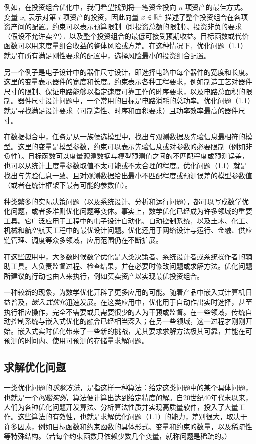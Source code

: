 例如，在投资组合优化中，我们希望找到将一笔资金投向 $n$ 项资产的最佳方式。变量 $x_i$ 表示对第 $i$ 项资产的投资，因此向量 $x\in\mathbb R^n$ 描述了整个投资组合在各项资产间的配置。约束可以表示预算限制（即投资总额的限制）、投资非负的要求（假设不允许卖空），以及整个投资组合的最低可接受预期收益。目标函数或代价函数可以用来度量组合收益的整体风险或方差。在这种情况下，优化问题（1.1）就是在所有满足刚性要求的配置中，选择风险最小的投资组合配置。

另一个例子是电子设计中的器件尺寸设计，即选择电路中每个器件的宽度和长度。这里的变量表示器件的宽度和长度。约束表示各种工程要求，例如制造工艺对器件尺寸的限制、保证电路能够以指定速度可靠工作的时序要求，以及电路总面积的限制。器件尺寸设计问题中，一个常用的目标是电路消耗的总功率。优化问题（1.1）就是寻找满足设计要求（可制造性、时序和面积要求）且功率效率最高的器件尺寸。

在数据拟合中，任务是从一族候选模型中，找出与观测数据及先验信息最相符的模型。这里的变量是模型参数，约束可以表示先验信息或对参数的必要限制（例如非负性）。目标函数可以度量观测数据与模型预测值之间的不匹配程度或预测误差，也可以从统计上度量参数取值不太可能或不太合理的程度。优化问题（1.1）就是找出与先验信息一致、且对观测数据给出最小不匹配程度或预测误差的模型参数值（或者在统计框架下最有可能的参数值）。

种类繁多的实际决策问题（以及系统设计、分析和运行问题），都可以写成数学优化问题，或者多准则优化问题等变体。事实上，数学优化已经成为许多领域的重要工具。它广泛应用于工程中的电子设计自动化、自动控制系统，以及土木、化工、机械和航空航天工程中的最优设计问题。优化还用于网络设计与运行、金融、供应链管理、调度等众多领域，应用范围仍在不断扩展。

在这些应用中，大多数时候数学优化是人类决策者、系统设计者或系统操作者的辅助工具。人负责监督过程、检查结果，并在必要时修改问题或求解方法。优化问题所建议的行动也由人来执行，例如买卖资产以实现最优投资组合。

一种较新的现象，为数学优化开辟了更多应用的可能。随着产品中嵌入式计算机日益普及，\emph{嵌入式优化}迅速发展。在这类应用中，优化用于自动作出实时选择，甚至执行相应操作，完全不需要或只需要很少的人为干预或监督。在一些领域，传统自动控制系统与嵌入式优化的融合已经相当深入；在另一些领域，这一过程才刚刚开始。嵌入式实时优化带来了一些新的挑战，尤其要求求解方法极其可靠，并能在可预测的时间内、使用可预测的存储量求解问题。

\subsection{求解优化问题}
一类优化问题的\emph{求解方法}，是指这样一种算法：给定这类问题中的某个具体问题，也就是一个\emph{问题实例}，算法便计算出达到给定精度的解。自20世纪40年代末以来，人们为各种优化问题开发算法、分析算法性质并实现高质量软件，投入了大量工作。这些算法的有效性，也就是求解优化问题（1.1）的能力，差别很大，取决于许多因素，例如目标函数和约束函数的具体形式、变量和约束的数量，以及稀疏性等特殊结构。（若每个约束函数只依赖少数几个变量，就称问题是稀疏的。）

